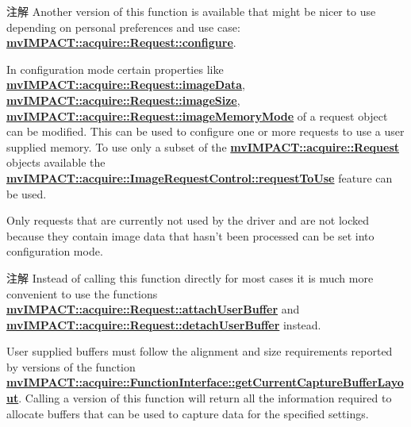 \begin{DoxyNote}{注解}
Another version of this function is available that might be nicer to use depending on personal preferences and use case\+: {\bfseries \hyperlink{classmv_i_m_p_a_c_t_1_1acquire_1_1_request_a5ad02aed16acd60699f3d8757c63af43}{mv\+I\+M\+P\+A\+C\+T\+::acquire\+::\+Request\+::configure}}.
\end{DoxyNote}
In configuration mode certain properties like {\bfseries \hyperlink{classmv_i_m_p_a_c_t_1_1acquire_1_1_request_ad676c45f908bb41df04b15a85bf1f6fd}{mv\+I\+M\+P\+A\+C\+T\+::acquire\+::\+Request\+::image\+Data}}, {\bfseries \hyperlink{classmv_i_m_p_a_c_t_1_1acquire_1_1_request_ac568c457aa474e73066bcc369a26cca1}{mv\+I\+M\+P\+A\+C\+T\+::acquire\+::\+Request\+::image\+Size}}, {\bfseries \hyperlink{classmv_i_m_p_a_c_t_1_1acquire_1_1_request_a05c7f2aad294449e1a9f6eb4a13597d4}{mv\+I\+M\+P\+A\+C\+T\+::acquire\+::\+Request\+::image\+Memory\+Mode}} of a request object can be modified. This can be used to configure one or more requests to use a user supplied memory. To use only a subset of the {\bfseries \hyperlink{classmv_i_m_p_a_c_t_1_1acquire_1_1_request}{mv\+I\+M\+P\+A\+C\+T\+::acquire\+::\+Request}} objects available the {\bfseries \hyperlink{classmv_i_m_p_a_c_t_1_1acquire_1_1_image_request_control_acb01d358421ecad7b28f3de692c4868d}{mv\+I\+M\+P\+A\+C\+T\+::acquire\+::\+Image\+Request\+Control\+::request\+To\+Use}} feature can be used.

Only requests that are currently not used by the driver and are not locked because they contain image data that hasn't been processed can be set into configuration mode.

\begin{DoxyNote}{注解}
Instead of calling this function directly for most cases it is much more convenient to use the functions {\bfseries \hyperlink{classmv_i_m_p_a_c_t_1_1acquire_1_1_request_acd8f58a136dafcb2bae251da383e2b18}{mv\+I\+M\+P\+A\+C\+T\+::acquire\+::\+Request\+::attach\+User\+Buffer}} and {\bfseries \hyperlink{classmv_i_m_p_a_c_t_1_1acquire_1_1_request_a154f54b267a1d9860d1206b2138ef8d0}{mv\+I\+M\+P\+A\+C\+T\+::acquire\+::\+Request\+::detach\+User\+Buffer}} instead.
\end{DoxyNote}
User supplied buffers must follow the alignment and size requirements reported by versions of the function {\bfseries \hyperlink{classmv_i_m_p_a_c_t_1_1acquire_1_1_function_interface_a45d71bedd05998dd9839e1fddc219d5a}{mv\+I\+M\+P\+A\+C\+T\+::acquire\+::\+Function\+Interface\+::get\+Current\+Capture\+Buffer\+Layout}}. Calling a version of this function will return all the information required to allocate buffers that can be used to capture data for the specified settings.

